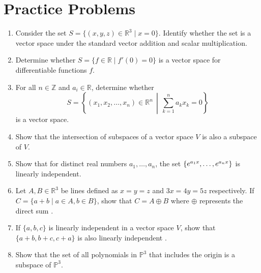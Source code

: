 \documentclass[../../main.tex]{subfiles}
\begin{document}
\section{Practice Problems}
\begin{enumerate}
\item
Consider the set $S = \{ (x, y, z) \in \mathbb{R}^3 \mid x = 0 \}$.
Identify whether the set is a vector space under the standard vector
addition and scalar multiplication.

\item
Determine whether $S = \{ f \in \mathbb{R} \mid f'(0) = 0 \}$
is a vector space for differentiable functions $f$.

\item
For all $n \in \mathbb{Z}$ and $a_i \in \mathbb{R}$, determine whether
\[
S =
\left\{
    (x_1, x_2, \ldots, x_n) \in \mathbb{R}^n
    \,\middle\vert\,
    \sum_{k = 1}^n a_k x_k = 0
\right\}
\]
is a vector space.

\item
Show that the intersection of subspaces of a vector space $V$
is also a subspace of $V$.

\item
Show that for distinct real numbers $a_1, \ldots, a_n$, the set
$\{ e^{a_1 x}, \ldots, \linebreak e^{a_n x} \}$ is linearly
independent.

\item
Let $A, B \in \mathbb{R}^3$ be lines defined as $x = y = z$ and
$3x = 4y = 5z$ respectively. If $C = \{ a + b \mid a \in A, b \in B
\}$, show that $C = A \oplus B$ where $\oplus$ represents the direct
sum \cite{MATH02-3}.

\item
If $\{ a, b, c \}$ is linearly independent in a vector space $V$,
show that $\{ a+b, b+c, c+a \}$ is also linearly independent
\cite{MATH02-3}.

\item
Show that the set of all polynomials in $\mathbb{P}^3$ that includes
the origin is a subspace of $\mathbb{P}^3$.
\end{enumerate}
\end{document}
